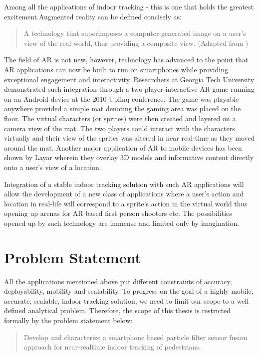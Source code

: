 Among all the applications of indoor tracking - this is one that holds the 
greatest excitement.Augmented reality can be defined concisely as:
\begin{quote}
A technology that superimposes a computer-generated image on a user's view of
the real world, thus providing a composite view. (Adapted from \cite{SciDict})
\end{quote}

The field of AR is not new, however, technology has advanced to the point that
AR applications can now be built to run on smartphones while providing
exceptional engagement and interactivity. Researchers at Georgia Tech University
demonstrated such integration through a two player interactive AR game running
on an Android device at the 2010 Uplinq conference. The game was playable
anywhere provided a simple mat denoting the gaming area was placed on the floor.
The virtual characters (or sprites) were then created and layered on a camera
view of the mat. The two players could interact with the characters virtually
and their view of the sprites was altered in near real-time as they moved around
the mat. Another major application of AR to mobile devices has been shown by 
Layar wherein they overlay 3D models and informative content directly onto 
a user's view of a location. 

Integration of a stable indoor tracking solution with such AR applications will
allow the development of a new class of applications where a user's action and
location in real-life will correspond to a sprite's action in the virtual world
thus opening up arenas for AR based first person shooters etc. The possibilities
opened up by such technology are immense and limited only by imagination.


\section{Problem Statement}

All the applications mentioned above put different constraints of accuracy, 
deployability, mobility and scalability. To progress on the goal of a highly 
mobile, accurate, scalable, indoor tracking solution, we need to limit our 
scope to a well defined analytical problem. Therefore, the scope of this thesis 
is restricted formally by the problem statement below: 

\begin{quote}
Develop and characterize a smartphone based particle filter sensor fusion
approach for near-realtime indoor tracking of pedestrians. 
\end{quote}
  

